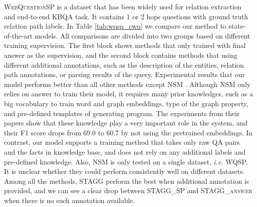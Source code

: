 \textsc{WebQuestionSP} is a dataset that has been widely used for relation extraction and end-to-end KBQA task. It contains 1 or 2 hops questions with ground truth relation path labels. In Table \ref{tab:wqsp_cwq} we compare our method to state-of-the-art models. All comparisons are divided into two groups based on different training supervision. The first block shows methods that only trained with final answer as the supervision, and the second block contains methods that using different additional annotations, such as the description of the entities, relation path annotations, or parsing results of the query. Experimental results that our model performs better than all other methods except NSM \cite{DBLP:conf/acl/LiangBLFL17}. Although NSM only relies on answer to train their model, it requires many prior knowledges, such as a big vocabulary to train word and graph embeddings, type of the graph property, and pre-defined templates of generating program. The experiments from their papers show that these knowledge play a very important role in the system, and their F1 score drops from 69.0 to 60.7 by not using the pretrained embeddings. In contrast, our model supports a training method that takes only raw QA pairs and the facts in knowledge base, and does not rely on any additional labels and pre-defined knowledge. Also, NSM is only tested on a single dataset, \emph{i.e.} WQSP. It is unclear whether they could perform consistently well on different datasets. Among all the methods, STAGG perform the best when additional annotation is provided, and we can see a clear drop between \textsc{STAGG\_SP} and \textsc{STAGG\_answer} when there is no such annotation available.




